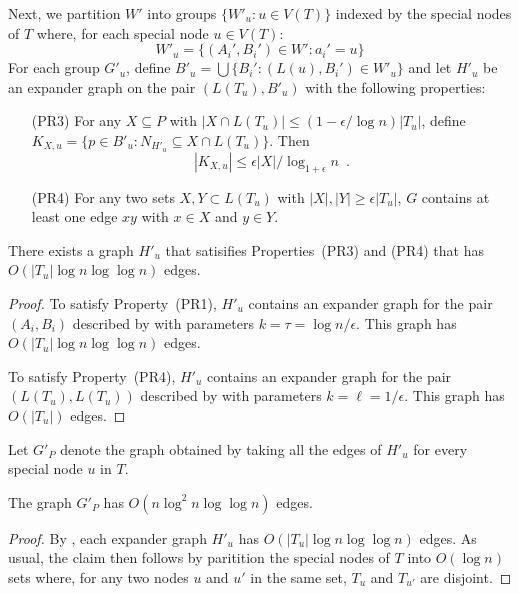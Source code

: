\documentclass{patmorin}
\begin{document}
Next, we partition $W'$ into groups $\{W'_u: u\in V(T)\}$ indexed by
the special nodes of $T$ where, for each special node $u\in V(T)$:
\[
	W'_u = \{ (A_i',B_i')\in W' : a_i' = u \}
\]
For each group $G'_u$, define $B'_u=\bigcup\{B_i' : (L(u),B_i')\in W'_u\}$
and let $H'_u$ be an expander graph on the pair $(L(T_u), B'_u)$ with
the following properties:
\begin{enumerate}
  \item[(PR3)] For any $X\subseteq P$ with $|X\cap L(T_u)|\le
  (1-\epsilon/\log n)|T_u|$, define $K_{X,u}=\{p\in B'_u:
  N_{H'_u}\subseteq X\cap L(T_u)\}$.  Then
   \[  |K_{X,u}|\le \epsilon|X|/\log_{1+\epsilon} n \enspace . \]

  \item[(PR4)] For any two sets $X,Y\subset L(T_u)$ with $|X|,|Y|\ge
  \epsilon|T_u|$, $G$ contains at least one edge $xy$ with $x\in X$
  and $y\in Y$.
\end{enumerate}

\begin{clm}
  There exists a graph $H'_u$ that satisifies Properties~(PR3) and (PR4)
  that has $O(|T_u|\log n\log\log n)$ edges.
\end{clm}

\begin{proof}
  To satisfy Property~(PR1), $H'_u$ contains an expander graph for the
  pair $(A_i,B_i)$ described by  with parameters
  $k=\tau=\log n/\epsilon$.  This graph has $O(|T_u|\log n\log\log n)$
  edges.

  To satisfy Property~(PR4), $H'_u$ contains an expander graph for the
  pair $(L(T_u),L(T_u))$ described by  with parameters
  $k=\ell=1/\epsilon$.  This graph has $O(|T_u|)$ edges.
\end{proof}

Let $G'_P$ denote the graph obtained by taking all the edges of $H'_u$
for every special node $u$ in $T$.

\begin{clm}
  The graph $G'_P$ has $O(n\log^2 n\log\log n)$ edges.
\end{clm}

\begin{proof}
  By , each expander graph $H'_u$ has $O(|T_u|\log
  n\log\log n)$ edges.  As usual, the claim then follows by paritition the
  special nodes of $T$ into $O(\log n)$ sets where, for any two nodes $u$
  and $u'$ in the same set, $T_u$ and $T_{u'}$ are disjoint.
\end{proof}
\end{document}
